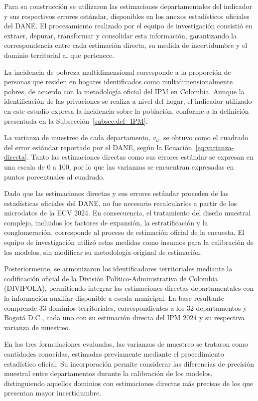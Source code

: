 Para su construcción se utilizaron las estimaciones departamentales del indicador y sus respectivos errores estándar, disponibles en los anexos estadísticos oficiales del DANE. El procesamiento realizado por el equipo de investigación consistió en extraer, depurar, transformar y consolidar esta información, garantizando la correspondencia entre cada estimación directa, su medida de incertidumbre y el dominio territorial al que pertenece.

La incidencia de pobreza multidimensional corresponde a la proporción de personas que residen en hogares identificados como multidimensionalmente pobres, de acuerdo con la metodología oficial del IPM en Colombia. Aunque la identificación de las privaciones se realiza a nivel del hogar, el indicador utilizado en este estudio expresa la incidencia sobre la población, conforme a la definición presentada en la Subsección~\ref{subsec:def_IPM}.

La varianza de muestreo de cada departamento, $v_d$, se obtuvo como el cuadrado del error estándar reportado por el DANE, según la Ecuación~\ref{eq:varianza-directa}. Tanto las estimaciones directas como sus errores estándar se expresan en una escala de 0 a 100, por lo que las varianzas se encuentran expresadas en puntos porcentuales al cuadrado.

Dado que las estimaciones directas y sus errores estándar proceden de las estadísticas oficiales del DANE, no fue necesario recalcularlos a partir de los microdatos de la ECV 2024. En consecuencia, el tratamiento del diseño muestral complejo, incluidos los factores de expansión, la estratificación y la conglomeración, corresponde al proceso de estimación oficial de la encuesta. El equipo de investigación utilizó estas medidas como insumos para la calibración de los modelos, sin modificar su metodología original de estimación.

Posteriormente, se armonizaron los identificadores territoriales mediante la codificación oficial de la División Político-Administrativa de Colombia (DIVIPOLA), permitiendo integrar las estimaciones directas departamentales con la información auxiliar disponible a escala municipal. La base resultante comprende 33 dominios territoriales, correspondientes a los 32 departamentos y Bogotá D.C., cada uno con su estimación directa del IPM 2024 y su respectiva varianza de muestreo.

En las tres formulaciones evaluadas, las varianzas de muestreo se trataron como cantidades conocidas, estimadas previamente mediante el procedimiento estadístico oficial. Su incorporación permite considerar las diferencias de precisión muestral entre departamentos durante la calibración de los modelos, distinguiendo aquellos dominios con estimaciones directas más precisas de los que presentan mayor incertidumbre.

